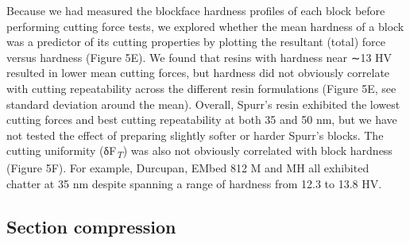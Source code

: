 \documentclass{article}
\begin{document}

Because we had measured the blockface hardness profiles of each block before performing cutting force tests, we explored whether the mean hardness of a block was a predictor of its cutting properties by plotting the resultant (total) force versus hardness (Figure 5E). We found that resins with hardness near ∼13 HV resulted in lower mean cutting forces, but hardness did not obviously correlate with cutting repeatability across the different resin formulations (Figure 5E, see standard deviation around the mean). Overall, Spurr’s resin exhibited the lowest cutting forces and best cutting repeatability at both 35 and 50 nm, but we have not tested the effect of preparing slightly softer or harder Spurr’s blocks. The cutting uniformity (δF\textsubscript{\emph{T}}) was also not obviously correlated with block hardness (Figure 5F). For example, Durcupan, EMbed 812 M and MH all exhibited chatter at 35 nm despite spanning a range of hardness from 12.3 to 13.8 HV.

\subsection*{Section compression}
\end{document}
